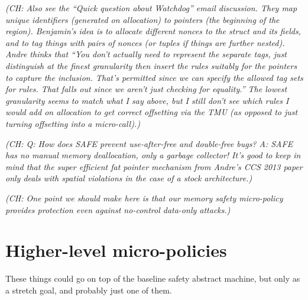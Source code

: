\documentclass{article}
\newcommand{\ch}[1]{{\color{dkblue}\em (CH: #1)}}
\newcommand{\micro}{micro-}
\newcommand{\uPs}{\micro policies\xspace}
\begin{document}
\ch{Also see the ``Quick question about Watchdog'' email discussion.
  They map unique identifiers (generated on allocation) to pointers
  (the beginning of the region). Benjamin's idea is to allocate
  different nonces to the struct and its fields, and to tag things
  with pairs of nonces (or tuples if things are further nested). Andre
  thinks that ``You don't actually need to represent the separate
  tags, just distinguish at the finest granularity then insert the
  rules suitably for the pointers to capture the inclusion.  That's
  permitted since we can specify the allowed tag sets for rules.  That
  falls out since we aren't just checking for equality.'' The lowest
  granularity seems to match what I say above, but I still don't see
  which rules I would add on allocation to get correct offsetting via
  the TMU (as opposed to just turning offsetting into a micro-call).}

\ch{Q: How does SAFE prevent use-after-free and double-free bugs? A:
  SAFE has no manual memory deallocation, only a garbage collector!
  It's good to keep in mind that the super efficient fat pointer
  mechanism from Andre's CCS 2013 paper only deals with spatial
  violations in the case of a stock architecture.}

\ch{One point we should make here is that our memory safety
  micro-policy provides protection even against no-control data-only
  attacks.}

\section{Higher-level \uPs}

These things could go on top of the baseline safety abstract machine,
but only as a stretch goal, and probably just one of them.

\newcommand{\TAG}[1]{\mbox{\sc #1}}
\end{document}
